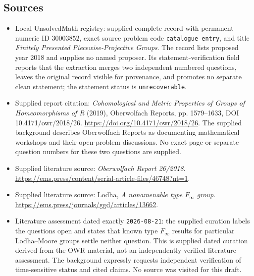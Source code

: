 \documentclass[11pt]{article}
\begin{document}
\subsection{Sources}
\begin{itemize}
\item Local UnsolvedMath registry: supplied complete record with permanent numeric ID \(30003852\), exact source problem code \texttt{catalogue entry}, and title \emph{Finitely Presented Piecewise-Projective Groups}. The record lists proposed year 2018 and supplies no named proposer. Its statement-verification field reports that the extraction merges two independent numbered questions, leaves the original record visible for provenance, and promotes no separate clean statement; the statement status is \texttt{unrecoverable}.
\item Supplied report citation: \emph{Cohomological and Metric Properties of Groups of Homeomorphisms of R} (2019), Oberwolfach Reports, pp. 1579--1633, DOI 10.4171/owr/2018/26. \url{https://doi.org/10.4171/owr/2018/26}. The supplied background describes Oberwolfach Reports as documenting mathematical workshops and their open-problem discussions. No exact page or separate question numbers for these two questions are supplied.
\item Supplied literature source: \emph{Oberwolfach Report 26/2018}. \url{https://ems.press/content/serial-article-files/46748?nt=1}.
\item Supplied literature source: Lodha, \emph{A nonamenable type \(F_\infty\) group}. \url{https://ems.press/journals/ggd/articles/13662}.
\item Literature assessment dated exactly \texttt{2026-08-21}: the supplied curation labels the questions open and states that known type \(F_\infty\) results for particular Lodha--Moore groups settle neither question. This is supplied dated curation derived from the OWR material, not an independently verified literature assessment. The background expressly requests independent verification of time-sensitive status and cited claims. No source was visited for this draft.
\end{itemize}
\end{document}
